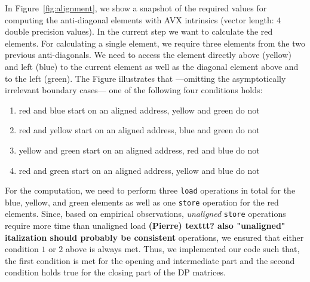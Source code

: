 \documentclass[runningheads,a4paper]{llncs}
\begin{document}
In Figure~\ref{fig:alignment}, we show a snapshot of the required values for computing the anti-diagonal elements with AVX intrinsics (vector length: $4$ double precision values). 
In the current step we want to calculate the red elements. 
For calculating a single element, we require three elements from the two previous anti-diagonals. 
We need to access the element directly above (yellow) and left (blue) to the current element as well as the diagonal element above and to the left  (green). 
The Figure illustrates that ---omitting the asymptotically irrelevant boundary cases--- one of the following four conditions holds:
\begin{enumerate}
  \item red and blue start on an aligned address, yellow and green do not
  \item red and yellow start on an aligned address, blue and green do not
  \item yellow and green start on an aligned address, red and blue do not
  \item red and green start on an aligned address, yellow and blue do not
\end{enumerate}

For the computation, we need to perform three \texttt{load} operations in total for the blue, yellow, and green elements as well as one \texttt{store} operation for the red elements. 
Since, based on empirical observations, {\em unaligned} \texttt{store} operations require more time than unaligned load \textbf{(Pierre) texttt? also "unaligned" italization should probably be consistent} operations, 
we ensured that either condition $1$ or $2$ above is always met. 
Thus, we implemented our code such that, the first condition is met for the opening and intermediate part and the second condition holds true for the closing part of the DP matrices. 


\end{document}
